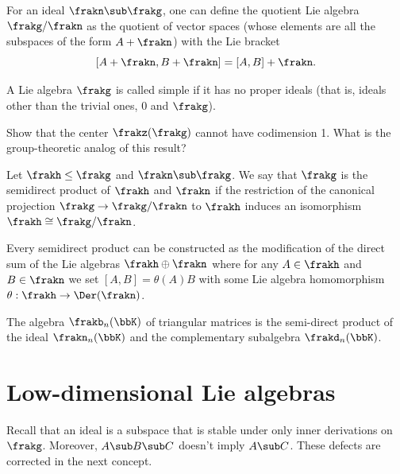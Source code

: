 \begin{defn}
    For an ideal $\frakn\sub\frakg$, one can define the quotient Lie algebra $\frakg\slash \frakn$ as the quotient of vector spaces (whose elements are all the subspaces of the form $A+\frakn$) with the Lie bracket
    \[[A+\frakn,B+\frakn]=[A,B]+\frakn.\]
\end{defn}

\begin{defn}
    A Lie algebra $\frakg$ is called simple if it has no proper ideals (that is, ideals other than the trivial ones, $0$ and $\frakg$).
\end{defn}


\begin{xca}
    Show that the center $\frakz(\frakg)$ cannot have codimension 1. What is the group-theoretic analog of this result?
\end{xca}


\begin{defn}
    Let $\frakh\leq \frakg$ and $\frakn\sub \frakg$. We say that $\frakg$ is the semidirect product of $\frakh$ and $\frakn$ if the restriction of the canonical projection $\frakg\to \frakg\slash\frakn$ to $\frakh$ induces an isomorphism $\frakh\cong \frakg\slash\frakn$.

    Every semidirect product can be constructed as the modification of the direct sum of the Lie algebras $\frakh\oplus\frakn$ where for any $A\in \frakh$ and $B\in\frakn$ we set $[A,B]=\theta(A)B$ with some Lie algebra homomorphism $\theta:\frakh\to \Der(\frakn)$.
\end{defn}

\begin{example}
    The algebra $\frakb_n(\bbK)$ of triangular matrices is the semi-direct product of the ideal $\frakn_n(\bbK)$ and the complementary subalgebra $\frakd_n(\bbK)$.
\end{example}





\section{Low-dimensional Lie algebras}\label{sec: low-dim lie algebras}

Recall that an ideal is a subspace that is stable under only inner derivations on $\frakg$. Moreover, $A\sub B\sub C$ doesn't imply $A\sub C$. These defects are corrected in the next concept.

